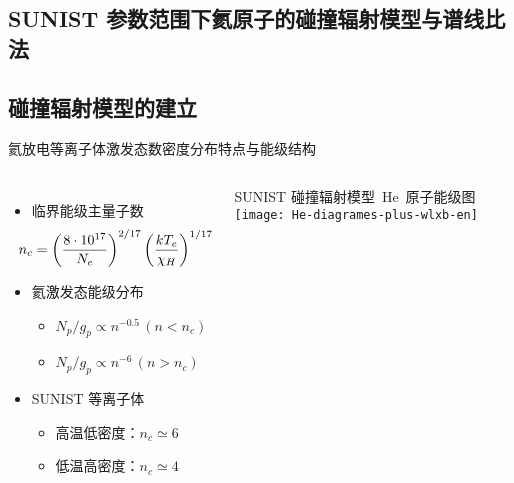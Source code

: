 \begin{CJK*}{UTF8}{kai}
\section{SUNIST 参数范围下氦原子的碰撞辐射模型与谱线比法}

\subsection{碰撞辐射模型的建立}

%

\begin{frame}{氦放电等离子体激发态数密度分布特点与能级结构}
	\begin{columns}
			\begin{itemize}
				\item 临界能级主量子数\\ 
					\[
					\hspace{-1em}
					n_c=\left(\frac{8\cdot10^{17}}{N_e}\right)^{2/17}
        			\left(\frac{kT_e}{\chi_H}\right)^{1/17}
        			\]
        		\item 氦激发态能级分布\\ 
        			\begin{itemize}
						\item $N_p/g_p\propto n^{-0.5}\,(n<n_c)$
						\item $N_p/g_p\propto n^{-6}\,(n>n_c)$
					\end{itemize}
				\item SUNIST 等离子体
					\begin{itemize}
						\item 高温低密度：$n_c\simeq 6$
						\item 低温高密度：$n_c\simeq 4$
					\end{itemize}
			\end{itemize}
			\centering
			SUNIST 碰撞辐射模型~He~原子能级图\\[1em]
			\texttt{[image: He-diagrames-plus-wlxb-en]}
	\end{columns}
\end{frame}


\end{CJK*}
